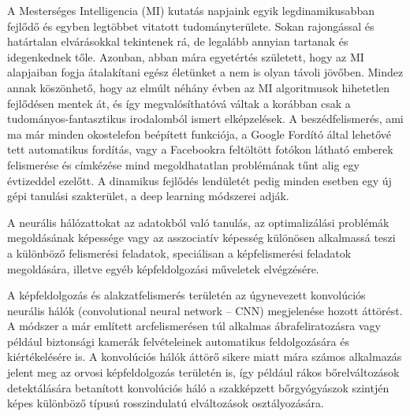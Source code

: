
A Mesterséges Intelligencia (MI) kutatás napjaink egyik legdinamikusabban fejlődő és egyben legtöbbet vitatott tudományterülete. Sokan rajongással és határtalan elvárásokkal tekintenek rá, de legalább annyian tartanak és idegenkednek tőle. Azonban, abban mára egyetértés született, hogy az MI alapjaiban fogja átalakítani egész életünket a nem is olyan távoli jövőben. Mindez annak köszönhető, hogy az elmúlt néhány évben az MI algoritmusok hihetetlen fejlődésen mentek át, és így megvalósíthatóvá váltak a korábban csak a tudományos-fantasztikus irodalomból ismert elképzelések. A beszédfelismerés, ami ma már minden okostelefon beépített funkciója, a Google Fordító által lehetővé tett automatikus fordítás, vagy a Facebookra feltöltött fotókon látható emberek felismerése és címkézése mind megoldhatatlan problémának tűnt alig egy évtizeddel ezelőtt. A dinamikus fejlődés lendületét pedig minden esetben egy új gépi tanulási szakterület, a deep learning módszerei adják. 

A neurális hálózattokat az adatokból való tanulás, az optimalizálási problémák megoldásának képessége vagy az asszociatív képesség különösen alkalmassá teszi a különböző felismerési feladatok, speciálisan a képfelismerési feladatok megoldására, illetve egyéb képfeldolgozási műveletek elvégzésére. 

A képfeldolgozás és alakzatfelismerés területén az úgynevezett konvolúciós neurális hálók (convolutional neural network – CNN) megjelenése hozott áttörést. A módszer a már említett arcfelismerésen túl alkalmas ábrafeliratozásra vagy például biztonsági kamerák felvételeinek automatikus feldolgozására és kiértékelésére is. A konvolúciós hálók áttörő sikere miatt mára számos alkalmazás jelent meg az orvosi képfeldolgozás területén is, így például rákos bőrelváltozások detektálására betanított konvolúciós háló a szakképzett bőrgyógyászok szintjén képes különböző típusú rosszindulatú elváltozások osztályozására. 